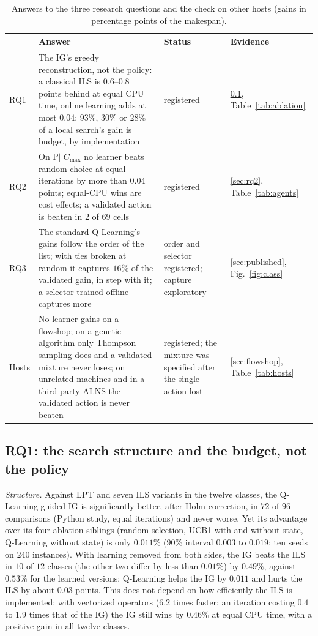 \documentclass[conference,a4paper]{IEEEtran}
\newcommand{\Cmax}{C_{\max}}
\begin{document}
\begin{table}[t]
\caption{Answers to the three research questions and the check on other hosts (gains in percentage points of the makespan).}
\label{tab:answers}
\centering
{\scriptsize\setlength{\tabcolsep}{3pt}
\begin{tabular}{@{}lp{11.3cm}p{3.2cm}l@{}}
\toprule
 & Answer & Status & Evidence \\
\midrule
RQ1 & The IG's greedy reconstruction, not the policy: a classical ILS is $0.6$--$0.8$ points behind at equal CPU time, online learning adds at most $0.04$; $93\%$, $30\%$ or $28\%$ of a local search's gain is budget, by implementation & registered & \ref{sec:rq1}, Table~\ref{tab:ablation} \\
RQ2 & On P$||\Cmax$ no learner beats random choice at equal iterations by more than $0.04$ points; equal-CPU wins are cost effects; a validated action is beaten in $2$ of $69$ cells & registered & \ref{sec:rq2}, Table~\ref{tab:agents} \\
RQ3 & The standard Q-Learning's gains follow the order of the list; with ties broken at random it captures $16\%$ of the validated gain, in step with it; a selector trained offline captures more & order and selector registered; capture exploratory & \ref{sec:published}, Fig.~\ref{fig:class} \\
Hosts & No learner gains on a flowshop; on a genetic algorithm only Thompson sampling does and a validated mixture never loses; on unrelated machines and in a third-party ALNS the validated action is never beaten & registered; the mixture was specified after the single action lost & \ref{sec:flowshop}, Table~\ref{tab:hosts} \\
\bottomrule
\end{tabular}}
\end{table}

\subsection{RQ1: the search structure and the budget, not the policy}
\label{sec:rq1}
\emph{Structure.} Against LPT and seven ILS variants in the twelve classes, the Q-Learning-guided IG is significantly better, after Holm correction, in $72$ of $96$ comparisons (Python study, equal iterations) and never worse.
Yet its advantage over its four ablation siblings (random selection, UCB1 with and without state, Q-Learning without state) is only $0.011\%$ ($90\%$ interval $0.003$ to $0.019$; ten seeds on $240$ instances).
With learning removed from both sides, the IG beats the ILS in $10$ of $12$ classes (the other two differ by less than $0.01\%$) by $0.49\%$, against $0.53\%$ for the learned versions: Q-Learning helps the IG by $0.011$ and hurts the ILS by about $0.03$ points.
This does not depend on how efficiently the ILS is implemented: with vectorized operators ($6.2$ times faster; an iteration costing $0.4$ to $1.9$ times that of the IG) the IG still wins by $0.46\%$ at equal CPU time, with a positive gain in all twelve classes.
\end{document}
